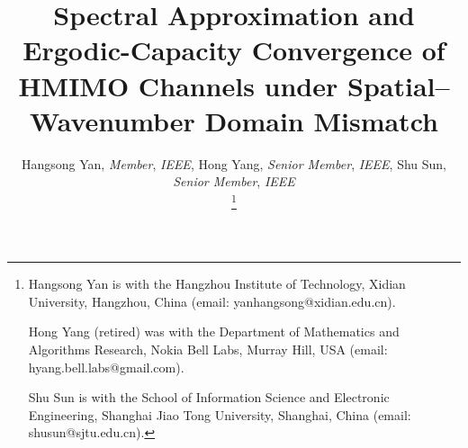 \documentclass[lettersize,journal]{IEEEtran}
\theoremstyle{plain}
\begin{document}
	\title{Spectral Approximation and Ergodic-Capacity Convergence of HMIMO Channels under Spatial–Wavenumber Domain Mismatch}
	
	\author{Hangsong Yan, \textit{Member}, \textit{IEEE}, Hong Yang, \textit{Senior Member}, 
	\textit{IEEE}, Shu Sun, \textit{Senior Member}, \textit{IEEE}
	
		\thanks{
			Hangsong Yan is with the Hangzhou Institute of Technology, Xidian University, Hangzhou, China (email: yanhangsong@xidian.edu.cn).
		
			Hong Yang (retired) was with the Department of Mathematics and Algorithms Research, Nokia Bell Labs, Murray Hill, USA (email: hyang.bell.labs@gmail.com). 
			
			Shu Sun is with the School of Information Science and Electronic Engineering, Shanghai Jiao Tong University, Shanghai, China (email: shusun@sjtu.edu.cn).


		}}
	
	
\maketitle
\end{document}
